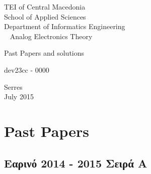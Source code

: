 \documentclass[12pt,a4paper,oneside]{book}
\begin{document}
\begin{titlepage}

\begin{center}
\Large TEI of Central Macedonia \\
\large School of Applied Sciences\\
Department of Informatics Engineering \\

\vspace*{8cm}
\Huge \,\,\, Analog Electronics Theory

\large Past Papers
 and solutions
 \vspace*{5cm}

dev23cc - 0000


 \vspace*{2.5cm}
 \nopagebreak
Serres\\
July 2015

\end{center}

\end{titlepage}


\chapter*{Past Papers}

\section*{Εαρινό 2014 - 2015 Σειρά Α}
\end{document}
